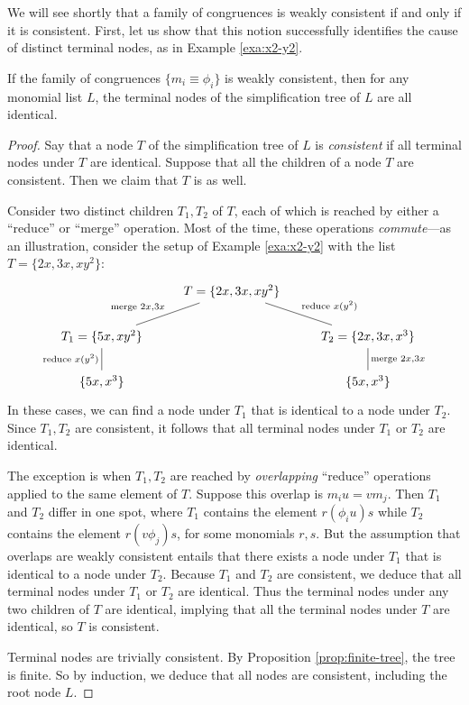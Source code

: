 We will see shortly that a family of congruences is weakly consistent if and only if it is consistent. First, let us show that this notion successfully identifies the cause of distinct terminal nodes, as in Example \ref{exa:x2-y2}.
\begin{prop}\label{prop:consistent-tree-terminals}
	If the family of congruences $\{m_i \equiv \phi_i\}$ is weakly consistent, then for any monomial list $L$, the terminal nodes of the simplification tree of $L$ are all identical.
\end{prop}
\begin{proof}
	Say that a node $T$ of the simplification tree of $L$ is \emph{consistent} if all terminal nodes under $T$ are identical. Suppose that all the children of a node $T$ are consistent. Then we claim that $T$ is as well.
	
	Consider two distinct children $T_1, T_2$ of $T$, each of which is reached by either a ``reduce'' or ``merge'' operation. Most of the time, these operations \emph{commute}---as an illustration, consider the setup of Example \ref{exa:x2-y2} with the list $T = \{2x, 3x, xy^2\}$:
	\[\begin{tikzcd}
	& T = \{2x, 3x, xy^2\} \arrow[dash, dl, swap, "\text{merge }2x{,} 3x"] \arrow[dash, dr, "\text{reduce }x(y^2)"]\\
	T_1=\{5x, xy^2\}\arrow[dash,d,swap, "\text{reduce }x(y^2)"] && T_2=\{2x, 3x, x^3\} \arrow[dash,d,"\text{merge }2x{,} 3x"]\\
	\{5x, x^3\} && \{5x, x^3\}
	\end{tikzcd}\]
	In these cases, we can find a node under $T_1$ that is identical to a node under $T_2$. Since $T_1,T_2$ are consistent, it follows that all terminal nodes under $T_1$ or $T_2$ are identical.
	
	The exception is when $T_1,T_2$ are reached by \emph{overlapping} ``reduce'' operations applied to the same element of $T$. Suppose this overlap is $m_i u = vm_j$. Then $T_1$ and $T_2$ differ in one spot, where $T_1$ contains the element $r(\phi_i u)s$ while $T_2$ contains the element $r(v\phi_j)s$, for some monomials $r,s$. But the assumption that overlaps are weakly consistent entails that there exists a node under $T_1$ that is identical to a node under $T_2$. Because $T_1$ and $T_2$ are consistent, we deduce that all terminal nodes under $T_1$ or $T_2$ are identical. Thus the terminal nodes under any two children of $T$ are identical, implying that all the terminal nodes under $T$ are identical, so $T$ is consistent.
	
	Terminal nodes are trivially consistent. By Proposition \ref{prop:finite-tree}, the tree is finite. So by induction, we deduce that all nodes are consistent, including the root node $L$.
\end{proof}
